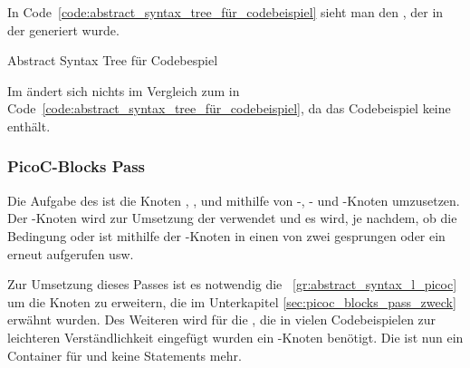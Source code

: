 In Code~\ref{code:abstract_syntax_tree_für_codebeispiel} sieht man den , der in der  generiert wurde.

\begin{code}
  \centering
  \caption{Abstract Syntax Tree für Codebespiel}
  \label{code:abstract_syntax_tree_für_codebeispiel}
\end{code}

Im  ändert sich nichts im Vergleich zum  in Code~\ref{code:abstract_syntax_tree_für_codebeispiel}, da das Codebeispiel keine  enthält.


\subsubsection{PicoC-Blocks Pass}
\label{picoc_blocks_pass}
\label{sec:picoc_blocks_pass_zweck}

Die Aufgabe des  ist die Knoten , ,  und  mithilfe von -, - und -Knoten umzusetzen. Der -Knoten wird zur Umsetzung der  verwendet und es wird, je nachdem, ob die Bedingung  oder  ist mithilfe der -Knoten in einen von zwei  gesprungen oder ein  erneut aufgerufen usw.


Zur Umsetzung dieses Passes ist es notwendig die ~\ref{gr:abstract_syntax_l_picoc} um die Knoten zu erweitern, die im Unterkapitel \ref{sec:picoc_blocks_pass_zweck} erwähnt wurden. Des Weiteren wird für die , die in vielen Codebeispielen zur leichteren Verständlichkeit eingefügt wurden ein -Knoten benötigt. Die   ist nun ein Container für   und keine Statements  mehr.

